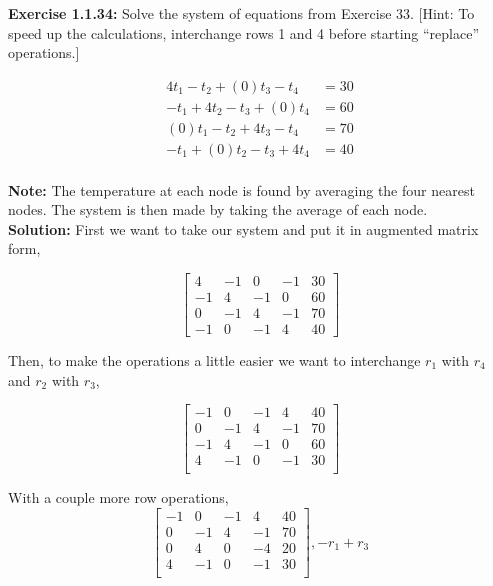 \documentclass{amsart}
\begin{document}
\noindent\textbf{Exercise 1.1.34: } Solve the system of equations from Exercise 33. [Hint: To speed up the calculations, interchange rows 1 and 4 before starting “replace” operations.]

\begin{align}
4t_{1}-t_{2}+(0)t_{3}-t_{4}&=30\\
-t_{1}+4t_{2}-t_{3}+(0)t_{4}&=60\\
(0)t_{1}-t_{2}+4t_{3}-t_{4}&=70\\
-t_{1}+(0)t_{2}-t_{3}+4t_{4}&=40
\end{align}\\
\noindent\textbf{Note:} The temperature at each node is found by averaging the four nearest nodes. The system is then made by taking the average of each node.\\


\noindent \textbf{Solution: }
First we want to take our system and put it in augmented matrix form,



\begin{equation}
\begin{bmatrix} 
4&-1&0&-1&30\\
-1&4&-1&0&60\\
0&-1&4&-1&70\\
-1&0&-1&4&40
\end{bmatrix}
\end{equation}

Then, to make the operations a little easier we want to interchange $r_1$ with $r_4$ and $r_2$ with $r_3$,

\begin{equation}
\begin{bmatrix} 
-1&0&-1&4&40\\
0&-1&4&-1&70\\
-1&4&-1&0&60\\
4&-1&0&-1&30\\
\end{bmatrix}
\end{equation}

With a couple more row operations,
\begin{equation}
\begin{bmatrix} 
-1&0&-1&4&40\\
0&-1&4&-1&70\\
0&4&0&-4&20\\
4&-1&0&-1&30\\
\end{bmatrix}, -r_1+r_3
\end{equation}
\end{document}
